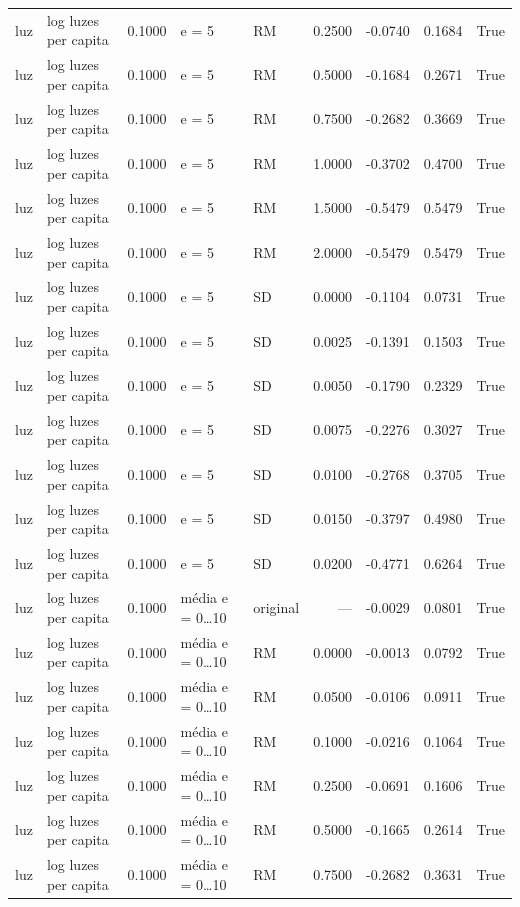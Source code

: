 \begin{table}
{\begin{tabular}{llrllrrrr}
luz & log luzes per capita & 0.1000 & e = 5 & RM & 0.2500 & -0.0740 & 0.1684 & True \\
luz & log luzes per capita & 0.1000 & e = 5 & RM & 0.5000 & -0.1684 & 0.2671 & True \\
luz & log luzes per capita & 0.1000 & e = 5 & RM & 0.7500 & -0.2682 & 0.3669 & True \\
luz & log luzes per capita & 0.1000 & e = 5 & RM & 1.0000 & -0.3702 & 0.4700 & True \\
luz & log luzes per capita & 0.1000 & e = 5 & RM & 1.5000 & -0.5479 & 0.5479 & True \\
luz & log luzes per capita & 0.1000 & e = 5 & RM & 2.0000 & -0.5479 & 0.5479 & True \\
luz & log luzes per capita & 0.1000 & e = 5 & SD & 0.0000 & -0.1104 & 0.0731 & True \\
luz & log luzes per capita & 0.1000 & e = 5 & SD & 0.0025 & -0.1391 & 0.1503 & True \\
luz & log luzes per capita & 0.1000 & e = 5 & SD & 0.0050 & -0.1790 & 0.2329 & True \\
luz & log luzes per capita & 0.1000 & e = 5 & SD & 0.0075 & -0.2276 & 0.3027 & True \\
luz & log luzes per capita & 0.1000 & e = 5 & SD & 0.0100 & -0.2768 & 0.3705 & True \\
luz & log luzes per capita & 0.1000 & e = 5 & SD & 0.0150 & -0.3797 & 0.4980 & True \\
luz & log luzes per capita & 0.1000 & e = 5 & SD & 0.0200 & -0.4771 & 0.6264 & True \\
luz & log luzes per capita & 0.1000 & média e = 0…10 & original & — & -0.0029 & 0.0801 & True \\
luz & log luzes per capita & 0.1000 & média e = 0…10 & RM & 0.0000 & -0.0013 & 0.0792 & True \\
luz & log luzes per capita & 0.1000 & média e = 0…10 & RM & 0.0500 & -0.0106 & 0.0911 & True \\
luz & log luzes per capita & 0.1000 & média e = 0…10 & RM & 0.1000 & -0.0216 & 0.1064 & True \\
luz & log luzes per capita & 0.1000 & média e = 0…10 & RM & 0.2500 & -0.0691 & 0.1606 & True \\
luz & log luzes per capita & 0.1000 & média e = 0…10 & RM & 0.5000 & -0.1665 & 0.2614 & True \\
luz & log luzes per capita & 0.1000 & média e = 0…10 & RM & 0.7500 & -0.2682 & 0.3631 & True \\

\end{tabular}}
\end{table}
